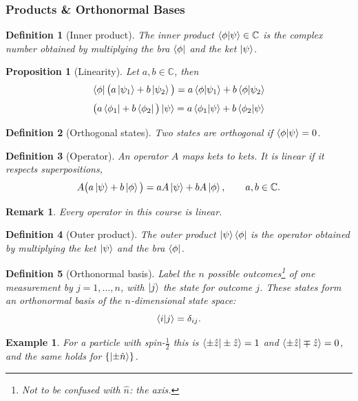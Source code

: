 \documentclass{article}
\newtheorem{definition}{Definition}
\newtheorem*{example}{Example}
\newtheorem{remark}{Remark}
\newtheorem{proposition}{Proposition}
\begin{document}
\subsubsection{Products \& Orthonormal Bases}
\begin{definition}[Inner product]
    The inner product $\braket{\phi|\psi} \in \mathbb{C}$ is the complex number obtained by multiplying the bra $\bra{\phi}$ and the ket $\ket{\psi}$.
\end{definition}
\begin{proposition}[Linearity]
    Let $a, b \in \mathbb{C}$, then
    \begin{equation}
        \bra{\phi}\big(a\ket{\psi_1} + b\ket{\psi_2}\big) = a\braket{\phi|\psi_1} + b\braket{\phi|\psi_2}
    \end{equation}
    \begin{equation}
        \big(a\bra{\phi_1} + b\bra{\phi_2}\big)\ket{\psi} = a\braket{\phi_1|\psi} + b\braket{\phi_2|\psi}
    \end{equation}
\end{proposition}
\begin{definition}[Orthogonal states]
    Two states are orthogonal if $\braket{\phi|\psi} = 0$.
\end{definition}
\begin{definition}[Operator]
    An operator $A$ maps kets to kets. It is linear if it respects superpositions,
    \[A\big(a\ket{\psi} + b\ket{\phi}\big) = aA\ket{\psi} + bA\ket{\phi}, \qquad a, b \in \mathbb{C}.\]
\end{definition}
\begin{remark}
    Every operator in this course is linear.    
\end{remark}
\begin{definition}[Outer product]
    The outer product $\ket{\psi}\bra{\phi}$ is the operator obtained by multiplying the ket $\ket{\psi}$ and the bra $\bra{\phi}$.
\end{definition}
\begin{definition}[Orthonormal basis]
    Label the $n$ possible outcomes\footnote{Not to be confused with $\hat{n}$: the axis.} of one measurement by $j = 1, \dots, n$, with $\ket{j}$ the state for outcome $j$. These states form an orthonormal basis of the $n$-dimensional state space:
    \begin{equation}
        \braket{i|j} = \delta_{ij}.
    \end{equation}
\end{definition}
\begin{example}
    For a particle with spin-$\tfrac12$ this is $\braket{\pm\hat{z}|\pm\hat{z}} = 1$ and $\braket{\pm\hat{z}|\mp\hat{z}} = 0$, and the same holds for $\{\ket{\pm\hat{n}}\}$.
\end{example}
\end{document}
